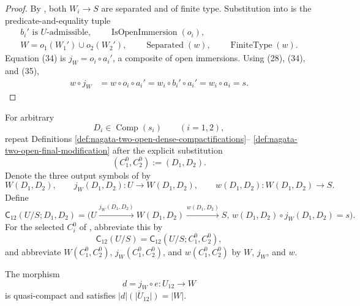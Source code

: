 \begin{proof}
  By , both $W_i\to S$ are
  separated and of finite type.  Substitution into
   is the predicate-and-equality tuple
  \[
  \begin{gathered}
    b_i'\text{ is }U\text{-admissible},\qquad
    \operatorname{IsOpenImmersion}(o_i),\\
    W=o_1(W_1')\cup o_2(W_2'),\qquad
    \operatorname{Separated}(w),\qquad
    \operatorname{FiniteType}(w).
  \end{gathered}
  \]
  Equation (34) is $j_W=o_i\circ a_i'$, a composite of open immersions.
  Using (28), (34), and (35),
  \[
  \begin{aligned}
    w\circ j_W
      &=w\circ o_i\circ a_i'
       =w_i\circ b_i'\circ a_i'
       =w_i\circ a_i
       =s.
  \end{aligned}
  \]
\end{proof}

\begin{definition}
  \label{def:nagata-two-open-compactification-candidate}

  For arbitrary
  \[
    D_i\in\operatorname{Comp}(s_i)\qquad(i=1,2),
  \]
  repeat Definitions
  \ref{def:nagata-two-open-dense-compactifications}--
  \ref{def:nagata-two-open-final-modification} after the explicit
  substitution
  \[
    (C_1^0,C_2^0):=(D_1,D_2).
  \]
  Denote the three output symbols of
   by
  \[
    W(D_1,D_2),\qquad
    j_W(D_1,D_2)\colon U\to W(D_1,D_2),\qquad
    w(D_1,D_2)\colon W(D_1,D_2)\to S.
  \]
  Define
  \[
    \mathsf C_{12}(U/S;D_1,D_2)
      =
      \bigl(
        U\xrightarrow{j_W(D_1,D_2)}W(D_1,D_2)
          \xrightarrow{w(D_1,D_2)}S,\,
        w(D_1,D_2)\circ j_W(D_1,D_2)=s
      \bigr).
  \]
  For the selected $C_i^0$ of
  , abbreviate this by
  \[
    \mathsf C_{12}(U/S)
      =\mathsf C_{12}(U/S;C_1^0,C_2^0),
  \]
  and abbreviate $W(C_1^0,C_2^0)$, $j_W(C_1^0,C_2^0)$, and
  $w(C_1^0,C_2^0)$ by $W$, $j_W$, and $w$.
\end{definition}

\begin{lemma}
  \label{lemma:nagata-final-density}

  The morphism
  \[
    d=j_W\circ e\colon U_{12}\to W
  \]
  is quasi-compact and satisfies
  $\overline{|d|(|U_{12}|)}=|W|$.
\end{lemma}

